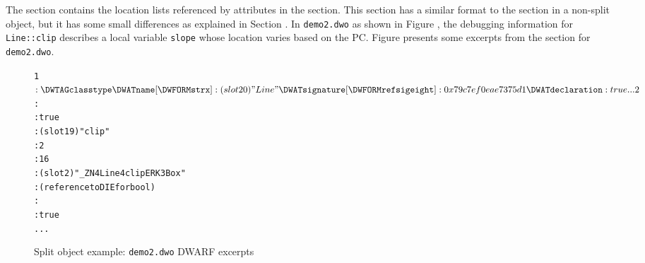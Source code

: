 The \dotdebuglocdwo{} section contains the location lists referenced
by \DWATlocation{} attributes in the \dotdebuginfodwo{} section. This
section has a similar format to the \dotdebugloc{} section in a
non-split object, but it has some small differences as explained
in Section . 
In \texttt{demo2.dwo} as shown in 
Figure , 
the debugging information for \texttt{Line::clip} describes a local 
variable \texttt{slope} whose location varies based on the PC.
Figure  
presents some excerpts from the \dotdebuginfodwo{} section for 
\texttt{demo2.dwo}.

\begin{figure}[b]
\begin{dwflisting}
\begin{alltt}

1$: \DWTAGclasstype
        \DWATname [\DWFORMstrx]: (slot 20) "Line"
        \DWATsignature [\DWFORMrefsigeight]: 0x79c7ef0eae7375d1
        \DWATdeclaration: true
    ...
2$:   \DWTAGsubprogram
          \DWATexternal: true
          \DWATname [\DWFORMstrx]: (slot 19) "clip"
          \DWATdeclfile: 2
          \DWATdeclline: 16
          \DWATlinkagename [\DWFORMstrx]: (slot 2) "_ZN4Line4clipERK3Box"
          \DWATtype: (reference to DIE for bool)
          \DWATaccessibility: \DWACCESSpublic
          \DWATdeclaration: true
      ...
\end{alltt}
\end{dwflisting}
\caption{Split object example: \texttt{demo2.dwo} DWARF \dotdebuginfodwo{} excerpts}
\label{fig:splitobjectexampledemo2dwodwarfdebuginfodwoexcerpts}
\end{figure}

